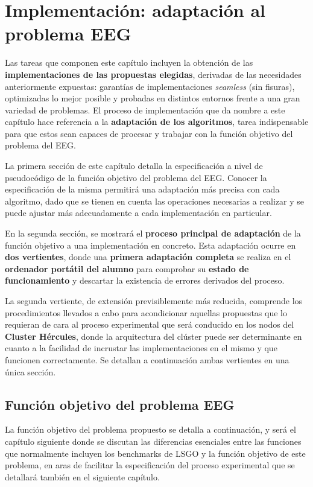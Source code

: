 \chapter{Implementación: adaptación al problema EEG}\label{cap:Implementacion}

Las tareas que componen este capítulo incluyen la obtención de las \textbf{implementaciones de las propuestas elegidas}, derivadas de las necesidades anteriormente expuestas: garantías de implementaciones \textit{seamless} (sin fisuras), optimizadas lo mejor posible y probadas en distintos entornos frente a una gran variedad de problemas. El proceso de implementación que da nombre a este capítulo hace referencia a la \textbf{adaptación de los algoritmos}, tarea indispensable para que estos sean capaces de procesar y trabajar con la función objetivo del problema del EEG.

La primera sección de este capítulo detalla la especificación a nivel de pseudocódigo de la función objetivo del problema del EEG. Conocer la especificación de la misma permitirá una adaptación más precisa con cada algoritmo, dado que se tienen en cuenta las operaciones necesarias a realizar y se puede ajustar más adecuadamente a cada implementación en particular.

En la segunda sección, se mostrará el \textbf{proceso principal de adaptación} de la función objetivo a una implementación en concreto. Esta adaptación ocurre en \textbf{dos vertientes}, donde una \textbf{primera adaptación completa} se realiza en el \textbf{ordenador portátil del alumno} para comprobar su \textbf{estado de funcionamiento} y descartar la existencia de errores derivados del proceso.

La segunda vertiente, de extensión previsiblemente más reducida, comprende los procedimientos llevados a cabo para acondicionar aquellas propuestas que lo requieran de cara al proceso experimental que será conducido en los nodos del \textbf{Cluster Hércules}, donde la arquitectura del clúster puede ser determinante en cuanto a la facilidad de incrustar las implementaciones en el mismo y que funcionen correctamente. Se detallan a continuación ambas vertientes en una única sección.

\section{Función objetivo del problema EEG}

La función objetivo del problema propuesto se detalla a continuación, y será el capítulo siguiente donde se discutan las diferencias esenciales entre las funciones que normalmente incluyen los benchmarks de LSGO y la función objetivo de este problema, en aras de facilitar la especificación del proceso experimental que se detallará también en el siguiente capítulo.

